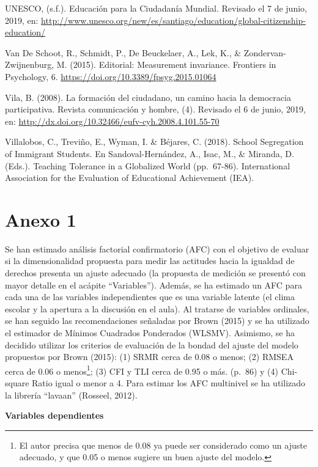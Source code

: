 \documentclass[12pt,twoside]{templates/facsothesis}
\begin{document}
UNESCO, (s.f.). Educación para la Ciudadanía Mundial. Revisado el 7 de junio, 2019, en: \url{http://www.unesco.org/new/es/santiago/education/global-citizenship-education/}

Van De Schoot, R., Schmidt, P., De Beuckelaer, A., Lek, K., \& Zondervan-Zwijnenburg, M. (2015). Editorial: Measurement invariance. Frontiers in Psychology, 6. \url{https://doi.org/10.3389/fpsyg.2015.01064}

Vila, B. (2008). La formación del ciudadano, un camino hacia la democracia participativa. Revista comunicación y hombre, (4). Revisado el 6 de junio, 2019, en: \url{http://dx.doi.org/10.32466/eufv-cyh.2008.4.101.55-70}

Villalobos, C., Treviño, E., Wyman, I. \& Béjares, C. (2018). School Segregation of Immigrant Students. En Sandoval-Hernández, A., Isac, M., \& Miranda, D. (Eds.). Teaching Tolerance in a Globalized World (pp.~67-86). International Association for the Evaluation of Educational Achievement (IEA).

\hypertarget{anexo-1}{%
\chapter*{Anexo 1}\label{anexo-1}}

Se han estimado análisis factorial confirmatorio (AFC) con el objetivo de evaluar si la dimensionalidad propuesta para medir las actitudes hacia la igualdad de derechos presenta un ajuste adecuado (la propuesta de medición se presentó con mayor detalle en el acápite ``Variables''). Además, se ha estimado un AFC para cada una de las variables independientes que es una variable latente (el clima escolar y la apertura a la discusión en el aula). Al tratarse de variables ordinales, se han seguido las recomendaciones señaladas por Brown (2015) y se ha utilizado el estimador de Mínimos Cuadrados Ponderados (WLSMV). Asimismo, se ha decidido utilizar los criterios de evaluación de la bondad del ajuste del modelo propuestos por Brown (2015): (1) SRMR cerca de 0.08 o menos; (2) RMSEA cerca de 0.06 o menos\footnote{El autor precisa que menos de 0.08 ya puede ser considerado como un ajuste adecuado, y que 0.05 o menos sugiere un buen ajuste del modelo.}; (3) CFI y TLI cerca de 0.95 o más. (p.~86) y (4) Chi-square Ratio igual o menor a 4. Para estimar los AFC multinivel se ha utilizado la librería ``lavaan'' (Rosseel, 2012).

\textbf{Variables dependientes}
\end{document}
